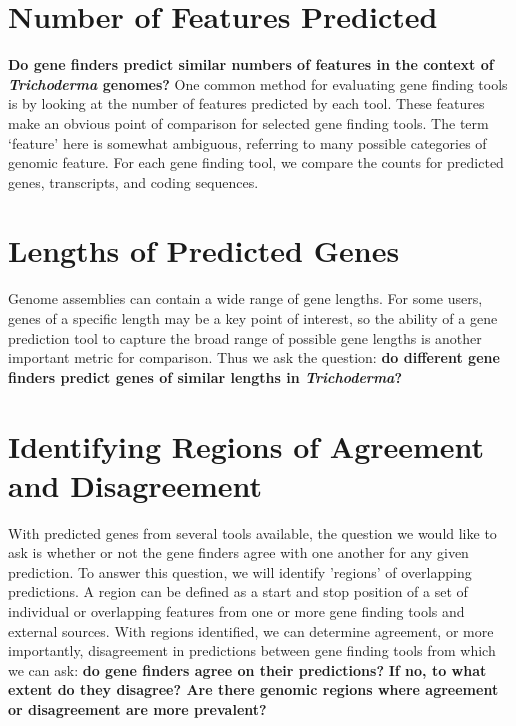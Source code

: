 \section{Number of Features Predicted}

\textbf{Do gene finders predict similar numbers of features in the
  context of \textit{Trichoderma} genomes?} 
\label{rq:number-of-features}  
One common method for
evaluating gene finding tools is by looking at the number of features
predicted by each tool. These features make an obvious point of
comparison for selected gene finding tools. The term `feature' here is
somewhat ambiguous, referring to many possible categories of genomic
feature. For each gene finding tool, we compare the counts for
predicted genes, transcripts, and coding sequences.

\section{Lengths of Predicted Genes}
\label{rq:gene-lengths}

Genome assemblies can contain a wide range of gene lengths. For some
users, genes of a specific length may be a key point of interest, so
the ability of a gene prediction tool to capture the broad range of
possible gene lengths is another important metric for comparison. Thus
we ask the question: \textbf{do different gene finders predict genes
  of similar lengths in \textit{Trichoderma}?}

\section{Identifying Regions of Agreement and Disagreement} \label{identify-regions}

With predicted genes from several tools available, the question we
would like to ask is whether or not the gene finders agree with one
another for any given prediction. To answer this question, we will
identify 'regions' of overlapping predictions. A region can be defined
as a start and stop position of a set of individual or overlapping
features from one or more gene finding tools and external
sources. With regions identified, we can determine agreement, or more
importantly, disagreement in predictions between gene finding tools
from which we can ask: \textbf{do gene finders agree on their
  predictions?} \textbf{If no, to what extent do they disagree? Are
  there genomic regions where agreement or disagreement are more
  prevalent?}

